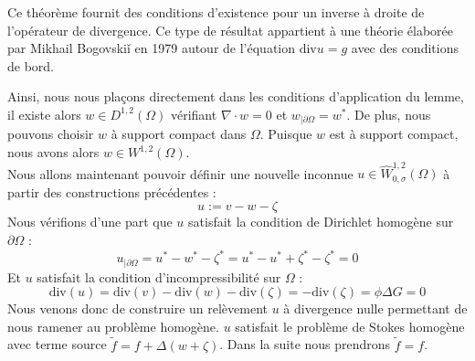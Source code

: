 \begin{remarkbox}
    \begin{remark}
        Ce théorème fournit des conditions d'existence pour un inverse à droite de l'opérateur de divergence. Ce type de résultat appartient à une théorie élaborée par Mikhail Bogovski\v{i} en 1979 autour de l'équation $\text{div}u = g$ avec des conditions de bord.
    \end{remark}
\end{remarkbox}
Ainsi, nous nous plaçons directement dans les conditions d'application du lemme, il existe alors $w \in D^{1,2}(\Omega)$ vérifiant $\nabla \cdot w = 0$ et $w_{|\partial \Omega} = w^*$. De plus, nous pouvons choisir $w$ à support compact dans $\Omega$. Puisque $w$ est à support compact, nous avons alors 
$w \in W^{1,2}(\Omega)$. \\
Nous allons maintenant pouvoir définir une nouvelle inconnue $u \in \widehat{W}^{1,2}_{0,\sigma}(\Omega)$ à partir des constructions précédentes :
$$ u := v - w - \zeta $$
Nous vérifions d'une part que $u$ satisfait la condition de Dirichlet homogène sur $\partial \Omega$ :
$$ u_{|\partial \Omega} = u^* - w^* - \zeta^* = u^* - u^* + \zeta^* - \zeta^* = 0$$
Et $u$ satisfait la condition d'incompressibilité sur $\Omega$ :
$$ \text{div}(u) = \text{div}(v) - \text{div}(w) - \text{div}(\zeta) = - \text{div}(\zeta) = \phi \Delta G = 0 $$
Nous venons donc de construire un relèvement $u$ à divergence nulle permettant de nous ramener au problème homogène. $u$ satisfait le problème de Stokes homogène avec terme source $\tilde{f} = f + \Delta(w + \zeta)$.
Dans la suite nous prendrons $\tilde{f} = f$.

